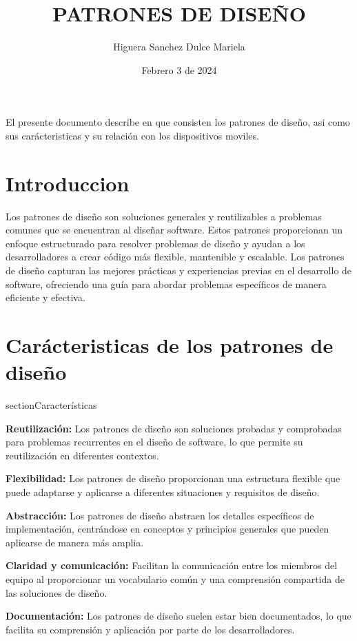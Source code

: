 \documentclass{article}
\title{PATRONES DE DISEÑO}
\author{Higuera Sanchez Dulce Mariela}
\date{Febrero 3 de 2024}
\begin{document}
 
	
	\maketitle 
	El presente documento describe en que consisten los patrones de diseño, asi como sus carácteristicas y su relación con los dispositivos moviles.
	
	\begin{multicols}{2}
		
		\section{Introduccion}
		Los patrones de diseño son soluciones generales y reutilizables a problemas comunes que se encuentran al diseñar software. Estos patrones proporcionan un enfoque estructurado para resolver problemas de diseño y ayudan a los desarrolladores a crear código más flexible, mantenible y escalable. Los patrones de diseño capturan las mejores prácticas y experiencias previas en el desarrollo de software, ofreciendo una guía para abordar problemas específicos de manera eficiente y efectiva.
		
		\section{Carácteristicas de los patrones de diseño}
		section{Características}
		
		\textbf{Reutilización:} Los patrones de diseño son soluciones probadas y comprobadas para problemas recurrentes en el diseño de software, lo que permite su reutilización en diferentes contextos.
		
		\textbf{Flexibilidad:} Los patrones de diseño proporcionan una estructura flexible que puede adaptarse y aplicarse a diferentes situaciones y requisitos de diseño.
		
		\textbf{Abstracción:} Los patrones de diseño abstraen los detalles específicos de implementación, centrándose en conceptos y principios generales que pueden aplicarse de manera más amplia.
		
		\textbf{Claridad y comunicación:} Facilitan la comunicación entre los miembros del equipo al proporcionar un vocabulario común y una comprensión compartida de las soluciones de diseño.
		
		\textbf{Documentación:} Los patrones de diseño suelen estar bien documentados, lo que facilita su comprensión y aplicación por parte de los desarrolladores.
		

\end{multicols}
\end{document}
